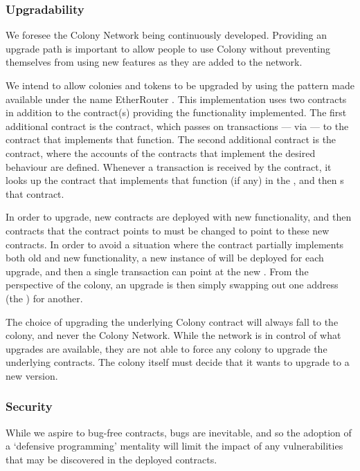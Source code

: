 \subsubsection{Upgradability}

We foresee the Colony Network being continuously developed. Providing an upgrade path is important to allow people to use Colony without preventing themselves from using new features as they are added to the network.

We intend to allow colonies and tokens to be upgraded by using the pattern made available under the name EtherRouter \cite{EtherRouter}. This implementation uses two contracts in addition to the contract(s) providing the functionality implemented. The first additional contract is the  contract, which passes on transactions --- via  --- to the contract that implements that function. The second additional contract is the  contract, where the accounts of the contracts that implement the desired behaviour are defined. Whenever a transaction is received by the  contract, it looks up the contract that implements that function (if any) in the , and then s that contract.

In order to upgrade, new contracts are deployed with new functionality, and then contracts that the  contract points to must be changed to point to these new contracts. In order to avoid a situation where the contract partially implements both old and new functionality,  a new instance of  will be deployed for each upgrade, and then a single transaction can point  at the new . From the perspective of the colony, an upgrade is then simply swapping out one address (the ) for another.

The choice of upgrading the underlying Colony contract will always fall to the colony, and never the Colony Network. While the network is in control of what upgrades are available, they are not able to force any colony to upgrade the underlying contracts. The colony itself must decide that it wants to upgrade to a new version.

\subsubsection{Security}

While we aspire to bug-free contracts, bugs are inevitable, and so the adoption of a `defensive programming' mentality will limit the impact of any vulnerabilities that may be discovered in the deployed contracts.

